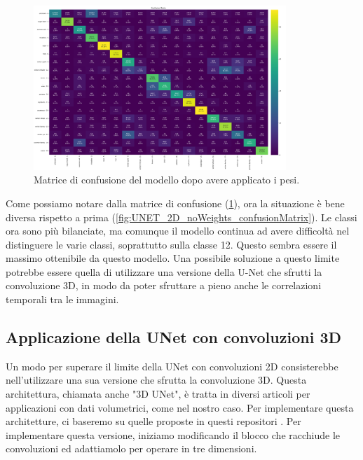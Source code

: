 \begin{figure}[H]
    \centering
    \includegraphics[angle=270,origin=c,width=0.85\textwidth]{Immagini/sperimentazione/UNET_2D_withWeights_confusionMatrix_50_epoche_edit.png}
    \caption{Matrice di confusione del modello dopo avere applicato i pesi.}
    \label{fig:UNET_2D_withWeights_confusionMatrix}
\end{figure}

Come possiamo notare dalla matrice di confusione (\ref{fig:UNET_2D_withWeights_confusionMatrix}), 
ora la situazione è bene diversa rispetto a prima 
(\ref{fig:UNET_2D_noWeights_confusionMatrix}). Le classi ora sono più bilanciate, ma 
comunque il modello continua ad avere difficoltà nel distinguere le varie classi, 
soprattutto sulla classe 12. 
Questo sembra essere il massimo ottenibile da questo modello. 
Una possibile soluzione a questo limite potrebbe essere quella di utilizzare una 
versione della U-Net che sfrutti la convoluzione 3D, in modo da poter sfruttare a 
pieno anche le correlazioni temporali tra le immagini.

\subsection{Applicazione della UNet con convoluzioni 3D}
Un modo per superare il limite della UNet con convoluzioni 2D consisterebbe 
nell'utilizzare una sua versione che sfrutta la convoluzione 3D. 
Questa architettura, chiamata anche "3D UNet", 
è tratta in diversi articoli \cite{Articolo1_3D_UNET,Articolo2_3D_UNET} per 
applicazioni con dati volumetrici, come nel nostro caso.
Per implementare questa architetture, ci baseremo su quelle proposte in questi 
repositori \cite{Implementazione1_3D_UNET, Implementazione2_3D_UNET}.
Per implementare questa versione, iniziamo modificando il blocco che 
racchiude le convoluzioni ed adattiamolo per operare in tre dimensioni.

